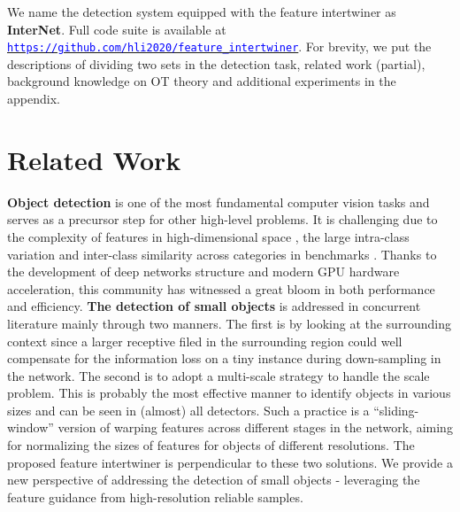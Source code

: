 \documentclass{article} \usepackage{iclr2019_conference,times}
\begin{document}
We name the detection system equipped with the feature intertwiner as \textbf{InterNet}.  Full code suite is available at \href{https://github.com/hli2020/feature_intertwiner}{
\texttt{\textcolor{blue}{https://github.com/hli2020/feature\_intertwiner}}}. For brevity, we put the descriptions of dividing two sets in the detection task, related work (partial), background knowledge on OT theory and additional experiments in the appendix.



\section{Related Work}\label{sec:related-work}

\textbf{Object detection}  
\citep{dai2016_rfcn,lin2017_FPN,redmon2016_yolo_v2,li2018_gradient,lu2018_grid,shi2018_pointrcnn}
is one of the most fundamental computer vision tasks and serves as a precursor step for other high-level  problems. 
It is challenging due to the complexity of features in high-dimensional space 
\citep{krizhevsky12_alexnet}, the large intra-class variation and inter-class similarity across categories in benchmarks
\citep{imagenet_conf,coco}. 
Thanks to the development of deep networks structure \citep{simonyan2015_vgg,he2016_resnet} and modern GPU hardware acceleration, this community has witnessed
a great bloom in both performance and efficiency. 
\textbf{The detection of small objects} is addressed in concurrent literature mainly through two manners. The first is by looking at the surrounding context \citep{li16_attentive_context,mottaghi14_context} since a larger receptive filed in the surrounding region 
could well compensate for the information loss on a tiny instance during down-sampling in the network. 
The second  is to adopt a multi-scale strategy \citep{li2018_zoom_journal,lin2017_FPN,liu2015_ssd,shrivastava2016_top_down_modulation} to handle the scale problem. This is probably the most effective manner to identify objects in various sizes and can be seen in (almost)
all detectors. Such a practice is a ``sliding-window'' version of warping features across different stages in the network, aiming for normalizing the sizes of features for objects of different resolutions.
The proposed feature intertwiner is perpendicular to these two solutions. We provide a new perspective of addressing the detection of small objects - leveraging the feature guidance from high-resolution reliable samples. 
\end{document}
